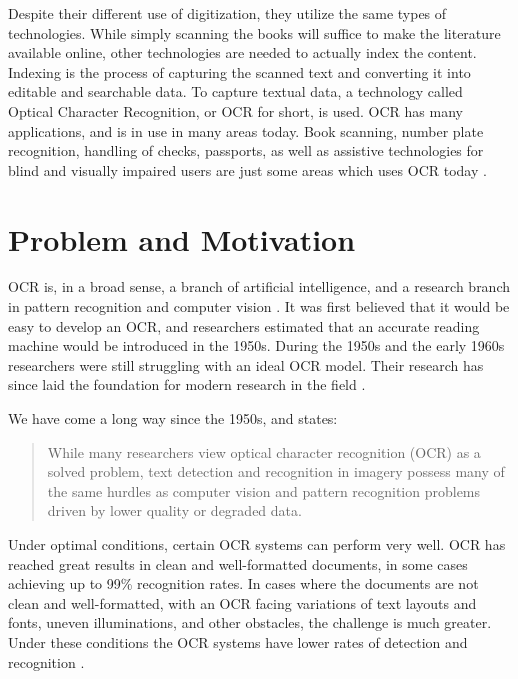 Despite their different use of digitization, they utilize the same types of technologies. While simply scanning the books will suffice to make the literature available online, other technologies are needed to actually index the content. Indexing is the process of capturing the scanned text and converting it into editable and searchable data. To capture textual data, a technology called Optical Character Recognition, or OCR for short, is used. OCR has many applications, and is in use in many areas today. Book scanning, number plate recognition, handling of checks, passports, as well as assistive technologies for blind and visually impaired users are just some areas which uses OCR today \citep{mori1999optical, kurzweil2000reading}.


\section{Problem and Motivation}
\label{sec:problem_motivation}
OCR is, in a broad sense, a branch of artificial intelligence, and a research branch in pattern recognition and computer vision \citep{mori1999optical}. It was first believed that it would be easy to develop an OCR, and researchers estimated that an accurate reading machine would be introduced in the 1950s. During the 1950s and the early 1960s researchers were still struggling with an ideal OCR model. Their research has since laid the foundation for modern research in the field \citep{mori1992historical}.

We have come a long way since the 1950s, and \citep{ye2015text} states:

\begin{quote}
    While many researchers view optical character recognition (OCR) as a solved problem, text detection and recognition in imagery possess many of the same hurdles as computer vision and pattern recognition problems driven by lower quality or degraded data.
\end{quote}

Under optimal conditions, certain OCR systems can perform very well. OCR has reached great results in clean and well-formatted documents, in some cases achieving up to 99\% recognition rates. In cases where the documents are not clean and well-formatted, with an OCR facing variations of text layouts and fonts, uneven illuminations, and other obstacles, the challenge is much greater. Under these conditions the OCR systems have lower rates of detection and recognition \citep{ye2015text}.

